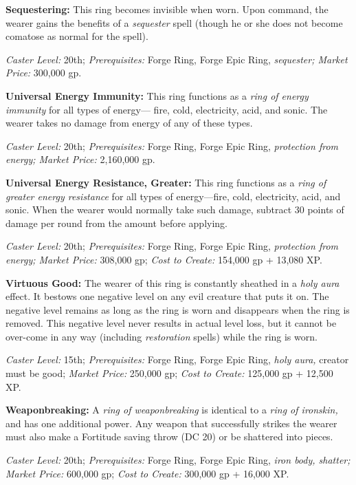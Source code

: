 \documentclass{article}
\begin{document}
\textbf{Sequestering: }This ring becomes invisible when worn. Upon command, the 
wearer gains the benefits of a \textit{sequester }spell (though he or she does 
not become comatose as normal for the spell). 

\textit{Caster Level: }20th; \textit{Prerequisites: }Forge Ring, Forge Epic Ring, 
\textit{sequester; Market Price: }300,000 gp. 

\textbf{Universal Energy Immunity: }This ring functions as a \textit{ring of energy 
immunity }for all types of energy--- fire, cold, electricity, acid, and sonic. 
The wearer takes no damage from energy of any of these types. 

\textit{Caster Level: }20th; \textit{Prerequisites: }Forge Ring, Forge Epic Ring, 
\textit{protection from energy; Market Price: }2,160,000 gp. 

\textbf{Universal Energy Resistance, Greater: }This ring functions as a \textit{ring 
of greater energy resistance }for all types of energy---fire, cold, electricity, 
acid, and sonic. When the wearer would normally take such damage, subtract 30 points 
of damage per round from the amount before applying. 

\textit{Caster Level: }20th; \textit{Prerequisites: }Forge Ring, Forge Epic Ring, 
\textit{protection from energy; Market Price:} 308,000 gp; \textit{Cost to Create: 
}154,000 gp + 13,080 XP. 

\textbf{Virtuous Good: }The wearer of this ring is constantly sheathed in a \textit{holy 
aura }effect. It bestows one negative level on any evil creature that puts it on. 
The negative level remains as long as the ring is worn and disappears when the 
ring is removed. This negative level never results in actual level loss, but it 
cannot be over-come in any way (including \textit{restoration }spells) while the 
ring is worn. 

\textit{Caster Level: }15th; \textit{Prerequisites: }Forge Ring, Forge Epic Ring, 
\textit{holy aura, }creator must be good; \textit{Market Price: }250,000 gp; \textit{Cost 
to Create: }125,000 gp + 12,500 XP. 

\textbf{Weaponbreaking: }A \textit{ring of weaponbreaking }is identical to a \textit{ring 
of ironskin, }and has one additional power. Any weapon that successfully strikes 
the wearer must also make a Fortitude saving throw (DC 20) or be shattered into 
pieces. 

\textit{Caster Level: }20th; \textit{Prerequisites: }Forge Ring, Forge Epic Ring, 
\textit{iron body, shatter; Market Price: }600,000 gp; \textit{Cost to Create: 
}300,000 gp + 16,000 XP. 
\end{document}
